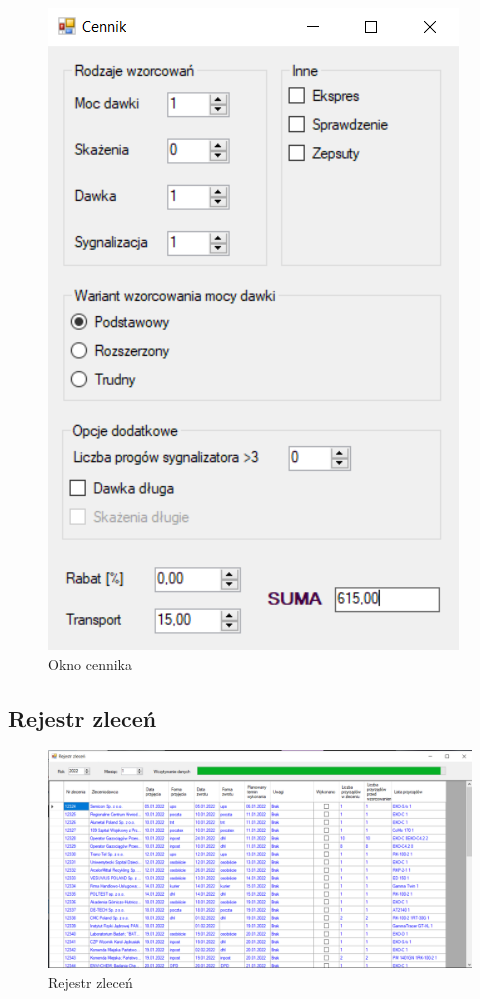 \begin{figure}[htb]
	\centering
	\includegraphics{obrazki/Biuro/cennik.png}
	\caption{Okno cennika}
	\label{cennikRys}
\end{figure}

\subsection{Rejestr zleceń}
\label{rejestr}

\begin{figure}[htb]
	\centering
	\includegraphics{obrazki/Biuro/rejestr_zlecen.png}
	\caption{Rejestr zleceń}
	\label{rejestrZlecen}
\end{figure}